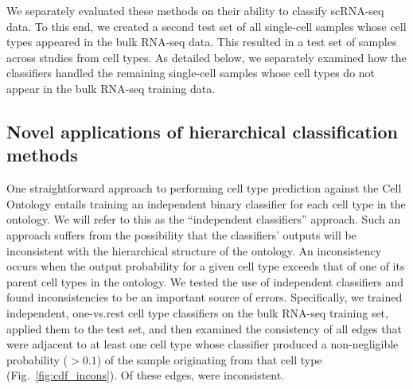 We separately evaluated these methods on their ability to classify scRNA-seq data. To this end, we created a second test set of all single-cell samples whose cell types appeared in the bulk RNA-seq data. This resulted in a test set of \BulkRestrictedSingleCellExperiments{} samples across \BulkRestrictedSingleCellStudies{} studies from \BulkRestrictedSingleCellCellTypes{} cell types. As detailed below, we separately examined how the classifiers handled the remaining single-cell samples whose cell types do not appear in the bulk RNA-seq training data.

\subsection*{Novel applications of hierarchical classification methods}

One straightforward approach to performing cell type prediction against the Cell Ontology entails training an independent binary classifier for each cell type in the ontology.  We will refer to this as the ``independent classifiers'' approach.  Such an approach suffers from the possibility that the classifiers' outputs will be inconsistent with the hierarchical structure of the ontology. An inconsistency occurs when the output probability for a given cell type exceeds that of one of its parent cell types in the ontology. We tested the use of independent classifiers and found inconsistencies to be an important source of errors. Specifically, we trained independent, one-vs.rest cell type classifiers on the bulk RNA-seq training set, applied them to the test set, and then examined the consistency of all edges that were adjacent to at least one cell type whose classifier produced a non-negligible probability ($> 0.1$) of the sample originating from that cell type (Fig.~\ref{fig:cdf_incons}).  Of these edges, \FracEdgesInconsistent{} were inconsistent.

